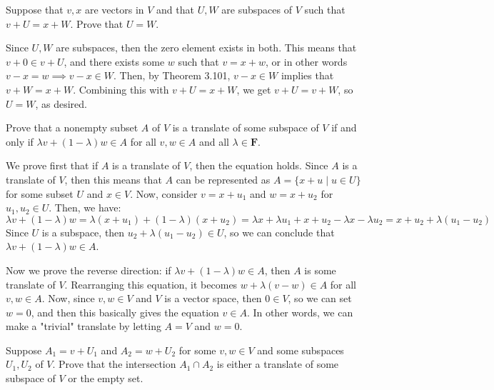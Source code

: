 \documentclass[10pt]{article}
\newcommand{\F}{\mathbf F}
\begin{document}
	\begin{problem}
		Suppose that \( v,x \) are vectors in \( V \) and that \( U, W \) are subspaces of \( V \) such that 
		\( v + U = x + W \). Prove that \( U = W \).
	\end{problem}

	\begin{solution}
		Since \( U, W \) are subspaces, then the zero element exists in both. This means that \( v + 0 \in v + U \), 
		and there exists some \( w \) such that \( v = x + w \), or in other words \( v - x = w 
		\implies v - x \in W\). Then, by Theorem 3.101, \( v - x \in W \) implies that \( v + W = 
		x + W\). Combining this with \( v + U = x + W \), we get \( v + U = v + W \), so \( U = W \), as 
		desired. 
	\end{solution}

	\begin{problem}
		Prove that a nonempty subset \( A \) of \( V \) is a translate of some subspace of \( V \) if 
		and only if \( \lambda v + (1 - \lambda) w \in A \) for all \( v, w \in A \) and all \( \lambda \in \F \). 
	\end{problem}

	\begin{solution}
		We prove first that if \( A \) is a translate of \( V \), then the equation holds. Since \( A \) is 
		a translate of \( V \), then this means that \( A \) can be represented as \( A = 
		\{x + u \mid u \in U\} \) for some subset \( U \) and \( x \in V \). Now, consider 
		\( v = x + u_1 \) and \( w = x + u_2 \) for \( u_1, u_2 \in U \). Then, we have:
		\[
		\lambda v + (1 - \lambda)w = \lambda(x + u_1) + (1 - \lambda)(x + u_2) = \lambda x + \lambda u_1 + x + u_2
		- \lambda x - \lambda u_2 = x + u_2 + \lambda(u_1 - u_2)
		\] 
		Since \( U \) is a subspace, then \( u_2 + \lambda(u_1 - u_2) \in U \), so 
		we can conclude that \( \lambda v + (1 - \lambda)w \in A \). 

		Now we prove the reverse direction: if \( \lambda v + (1 - \lambda)w \in A \), then 
		\( A \) is some translate of \( V \). Rearranging this equation, it becomes \( w + \lambda(v - w) \in A\)
		for all \( v, w \in A \). Now, since \( v, w \in V \) and \( V \) is a vector space, then \( 0 \in V \), 
		so we can set \( w = 0 \), and then this basically gives the equation \( v \in A \). In other words, 
		we can make a "trivial" translate by letting \( A = V \) and \( w = 0  \). 
	\end{solution}

	\begin{problem}
		Suppose \( A_1 = v + U_1 \) and \( A_2 = w + U_2 \) for some \( v, w \in V \) and some 
		subspaces \( U_1, U_2  \) of \( V \). Prove that the intersection \( A_1 \cap A_2 \) is either 
		a translate of some subspace of \( V \) or the empty set. 
	\end{problem}
\end{document}
